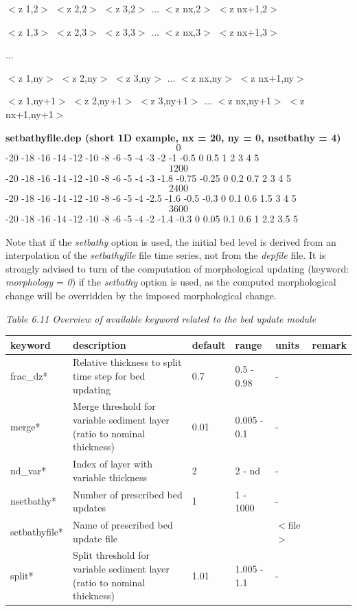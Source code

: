 \documentclass{article}
\begin{document}
\noindent $<$z 1,2$>$ $<$z 2,2$>$ $<$z 3,2$>$ ... $<$z nx,2$>$ $<$z nx+1,2$>$

\noindent $<$z 1,3$>$ $<$z 2,3$>$ $<$z 3,3$>$ ... $<$z nx,3$>$ $<$z nx+1,3$>$

\noindent ...

\noindent $<$z 1,ny$>$ $<$z 2,ny$>$ $<$z 3,ny$>$ ... $<$z nx,ny$>$ $<$z nx+1,ny$>$

\noindent $<$z 1,ny+1$>$ $<$z 2,ny+1$>$ $<$z 3,ny+1$>$ ... $<$z nx,ny+1$>$ $<$z nx+1,ny+1$>$

\noindent \textbf{setbathyfile.dep (short 1D example, nx = 20, ny = 0, nsetbathy = 4)}
\[0\] 
-20 -18 -16 -14 -12 -10 -8 -6 -5 -4 -3 -2 -1 -0.5 0 0.5 1 2 3 4 5
\[1200\] 
-20 -18 -16 -14 -12 -10 -8 -6 -5 -4 -3 -1.8 -0.75 -0.25 0 0.2 0.7 2 3 4 5
\[2400\] 
-20 -18 -16 -14 -12 -10 -8 -6 -5 -4 -2.5 -1.6 -0.5 -0.3 0 0.1 0.6 1.5 3 4 5
\[3600\] 
-20 -18 -16 -14 -12 -10 -8 -6 -5 -4 -2 -1.4 -0.3 0 0.05 0.1 0.6 1 2.2 3.5 5

\noindent Note that if the \textit{setbathy} option is used, the initial bed level is derived from an interpolation of the \textit{setbathyfile }file time series, not from the \textit{depfile }file. It is strongly advised to turn of the computation of morphological updating (keyword: \textit{morphology} = \textit{0}) if the \textit{setbathy} option is used, as the computed morphological change will be overridden by the imposed morphological change.

\noindent \textit{Table 6.11 Overview of available keyword related to the bed update module}

\begin{tabular}{|p{0.8in}|p{1.0in}|p{0.6in}|p{0.7in}|p{0.5in}|p{0.6in}|} \hline 
keyword & description & default & range & units & remark \\ \hline 
frac\_dz* & Relative thickness to split time step for bed updating & 0.7 & 0.5 - 0.98 & - &  \\ \hline 
merge* & Merge threshold for variable sediment layer (ratio to nominal thickness) & 0.01 & 0.005 - 0.1 & - &  \\ \hline 
nd\_var* & Index of layer with variable thickness & 2 & 2 - nd & - &  \\ \hline 
nsetbathy* & Number of prescribed bed updates & 1 & 1 - 1000 & - &  \\ \hline 
setbathyfile* & Name of prescribed bed update file &  &  & $<$file$>$ &  \\ \hline 
split* & Split threshold for variable sediment layer (ratio to nominal thickness) & 1.01 & 1.005 - 1.1 & - &  \\ \hline 
\end{tabular}
\end{document}
